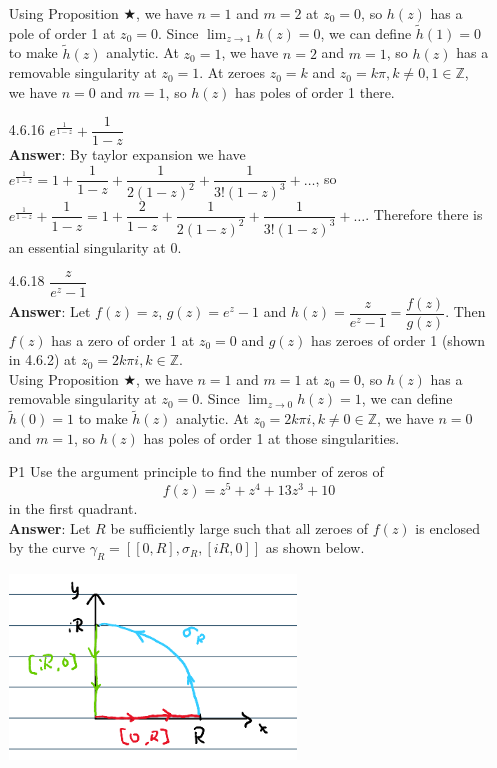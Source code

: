 \documentclass{article}
\begin{document}
\begin{itemize}
            Using Proposition $\bigstar$, we have $n=1$ and $m=2$ at $z_0=0$, so $h(z)$ has a pole of order 1 at $z_0=0$. Since $\lim_{z\rightarrow 1}h(z)=0$, we can define $\tilde{h}(1)=0$ to make $\tilde{h}(z)$ analytic. At $z_0=1$, we have $n=2$ and $m=1$, so $h(z)$ has a removable singularity at $z_0=1$. At zeroes $z_0=k$ and $z_0=k\pi,k\neq 0,1\in\mathbb{Z}$, we have $n=0$ and $m=1$, so $h(z)$ has poles of order 1 there.
      \item [4.6.16] $e^\frac{1}{1-z}+\dfrac{1}{1-z}$\\
            \textbf{Answer}: By taylor expansion we have $e^\frac{1}{1-z}=1+\dfrac{1}{1-z}+\dfrac{1}{2(1-z)^2}+\dfrac{1}{3!(1-z)^3}+\ldots$, so $e^\frac{1}{1-z}+\dfrac{1}{1-z}=1+\dfrac{2}{1-z}+\dfrac{1}{2(1-z)^2}+\dfrac{1}{3!(1-z)^3}+\ldots$. Therefore there is an essential singularity at $0$.
      \item [4.6.18] $\dfrac{z}{e^z-1}$\\
            \textbf{Answer}: Let $f(z)=z$, $g(z)=e^z-1$ and $h(z)=\dfrac{z}{e^z-1}=\dfrac{f(z)}{g(z)}$. Then $f(z)$ has a zero of order 1 at $z_0=0$ and $g(z)$ has zeroes of order 1 (shown in 4.6.2) at $z_0=2k\pi i,k\in\mathbb{Z}$.\\
            Using Proposition $\bigstar$, we have $n=1$ and $m=1$ at $z_0=0$, so $h(z)$ has a removable singularity at $z_0=0$. Since $\lim_{z\rightarrow 0}h(z)=1$, we can define $\tilde{h}(0)=1$ to make $\tilde{h}(z)$ analytic. At $z_0=2k\pi i,k\neq 0\in\mathbb{Z}$, we have $n=0$ and $m=1$, so $h(z)$ has poles of order 1 at those singularities.
      \item [P1] Use the argument principle to find the number of zeros of \[f(z)=z^5+z^4+13z^3+10\] in the first quadrant.\\
            \textbf{Answer}: Let $R$ be sufficiently large such that all zeroes of $f(z)$ is enclosed by the curve $\gamma_R=[[0,R],\sigma_R,[iR,0]]$ as shown below.
            \begin{center}
                  \includegraphics[width=3in]{p1-1.png}

\end{center}
\end{itemize}
\end{document}
